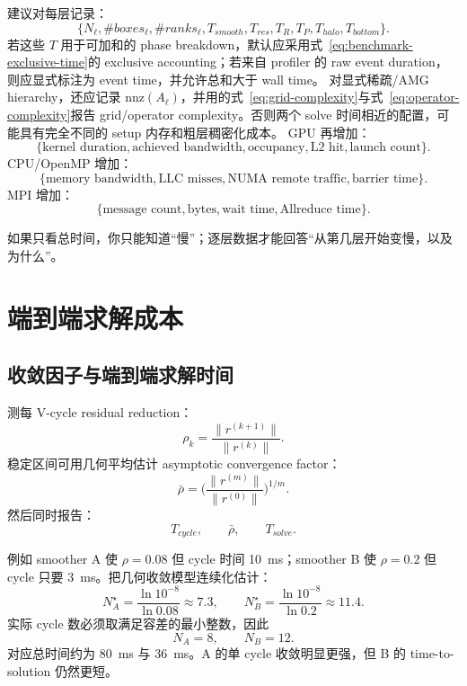 建议对每层记录：
\begin{equation}
\{N_\ell,\#boxes_\ell,\#ranks_\ell,T_{smooth},T_{res},T_R,T_P,T_{halo},T_{bottom}\}.
\end{equation}
若这些 $T$ 用于可加和的 phase breakdown，默认应采用式~\eqref{eq:benchmark-exclusive-time}的 exclusive accounting；若来自 profiler 的 raw event duration，则应显式标注为 event time，并允许总和大于 wall time。
对显式稀疏/AMG hierarchy，还应记录 $\mathrm{nnz}(A_\ell)$，并用的式~\eqref{eq:grid-complexity}与式~\eqref{eq:operator-complexity}报告 grid/operator complexity。否则两个 solve 时间相近的配置，可能具有完全不同的 setup 内存和粗层稠密化成本。
GPU 再增加：
\begin{equation}
\{\text{kernel duration},\text{achieved bandwidth},\text{occupancy},\text{L2 hit},\text{launch count}\}.
\end{equation}
CPU/OpenMP 增加：
\begin{equation}
\{\text{memory bandwidth},\text{LLC misses},\text{NUMA remote traffic},\text{barrier time}\}.
\end{equation}
MPI 增加：
\begin{equation}
\{\text{message count},\text{bytes},\text{wait time},\text{Allreduce time}\}.
\end{equation}

如果只看总时间，你只能知道“慢”；逐层数据才能回答“从第几层开始变慢，以及为什么”。

\section{端到端求解成本}

\subsection{收敛因子与端到端求解时间}

测每 V-cycle residual reduction：
\begin{equation}
\rho_k=\frac{\|r^{(k+1)}\|}{\|r^{(k)}\|}.
\end{equation}
稳定区间可用几何平均估计 asymptotic convergence factor：
\begin{equation}
\bar\rho=\biggl(\frac{\|r^{(m)}\|}{\|r^{(0)}\|}\biggr)^{1/m}.
\end{equation}
然后同时报告：
\begin{equation}
T_{cycle},\qquad \bar\rho,\qquad T_{solve}.
\end{equation}

例如 smoother A 使 $\rho=0.08$ 但 cycle 时间 \SI{10}{ms}；smoother B 使 $\rho=0.2$ 但 cycle 只要 \SI{3}{ms}。把几何收敛模型连续化估计：
\begin{equation}
N_A^\star=\frac{\ln10^{-8}}{\ln0.08}\approx7.3,
\qquad
N_B^\star=\frac{\ln10^{-8}}{\ln0.2}\approx11.4.
\end{equation}
实际 cycle 数必须取满足容差的最小整数，因此
\begin{equation}
N_A=8,
\qquad
N_B=12.
\end{equation}
对应总时间约为 \SI{80}{ms} 与 \SI{36}{ms}。A 的单 cycle 收敛明显更强，但 B 的 time-to-solution 仍然更短。

